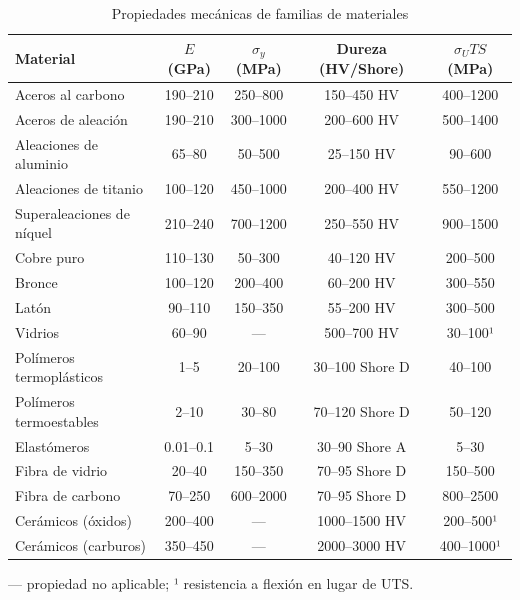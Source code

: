 \begin{table}[htbp]
  \centering
  \small
  \caption{Propiedades mecánicas de familias de materiales}
  \label{tab:prop_mat_mecanicas}
  \begin{tabular}{@{} l c c c c @{}}
    \toprule
    Material                  & $E$ (GPa) & $\sigma_y$ (MPa) & Dureza (HV/Shore) & $\sigma_UTS$ (MPa)\tnote{1} \\
    \midrule
    Aceros al carbono         & 190–210   & 250–800          & 150–450 HV        & 400–1200          \\
    Aceros de aleación        & 190–210   & 300–1000         & 200–600 HV        & 500–1400          \\
    Aleaciones de aluminio    & 65–80     & 50–500           & 25–150 HV         & 90–600            \\
    Aleaciones de titanio     & 100–120   & 450–1000         & 200–400 HV        & 550–1200          \\
    Superaleaciones de níquel & 210–240   & 700–1200         & 250–550 HV        & 900–1500          \\
    Cobre puro                & 110–130   & 50–300           & 40–120 HV         & 200–500           \\
    Bronce                    & 100–120   & 200–400          & 60–200 HV         & 300–550           \\
    Latón                     & 90–110    & 150–350          & 55–200 HV         & 300–500           \\
    Vidrios                   & 60–90     & —                & 500–700 HV        & 30–100¹           \\
    Polímeros termoplásticos  & 1–5       & 20–100           & 30–100 Shore D    & 40–100            \\
    Polímeros termoestables   & 2–10      & 30–80            & 70–120 Shore D    & 50–120            \\
    Elastómeros               & 0.01–0.1  & 5–30             & 30–90 Shore A     & 5–30              \\
    Fibra de vidrio           & 20–40     & 150–350          & 70–95 Shore D     & 150–500           \\
    Fibra de carbono          & 70–250    & 600–2000         & 70–95 Shore D     & 800–2500          \\
    Cerámicos (óxidos)        & 200–400   & —                & 1000–1500 HV      & 200–500¹          \\
    Cerámicos (carburos)      & 350–450   & —                & 2000–3000 HV      & 400–1000¹         \\
    \bottomrule
  \end{tabular}

  \vspace{1mm}
  \footnotesize
  — propiedad no aplicable; ¹ resistencia a flexión en lugar de UTS.
\end{table}

